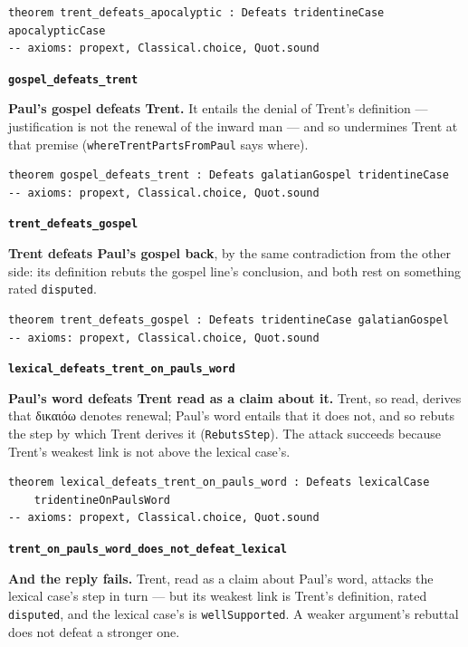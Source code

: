 \documentclass[11pt]{article}
\begin{document}
{\small\begin{verbatim}
theorem trent_defeats_apocalyptic : Defeats tridentineCase apocalypticCase
-- axioms: propext, Classical.choice, Quot.sound
\end{verbatim}}
\par\medskip\noindent\textbf{\texttt{gospel\_\allowbreak{}defeats\_\allowbreak{}trent}}\par\nobreak\noindent
\textbf{Paul's gospel defeats Trent.} It entails the denial of Trent's definition — justification is not the renewal of the inward man — and so undermines Trent at that premise (\texttt{where\allowbreak{}Trent\allowbreak{}Parts\allowbreak{}From\allowbreak{}Paul} says where).

{\small\begin{verbatim}
theorem gospel_defeats_trent : Defeats galatianGospel tridentineCase
-- axioms: propext, Classical.choice, Quot.sound
\end{verbatim}}
\par\medskip\noindent\textbf{\texttt{trent\_\allowbreak{}defeats\_\allowbreak{}gospel}}\par\nobreak\noindent
\textbf{Trent defeats Paul's gospel back}, by the same contradiction from the other side: its definition rebuts the gospel line's conclusion, and both rest on something rated \texttt{disputed}.

{\small\begin{verbatim}
theorem trent_defeats_gospel : Defeats tridentineCase galatianGospel
-- axioms: propext, Classical.choice, Quot.sound
\end{verbatim}}
\par\medskip\noindent\textbf{\texttt{lexical\_\allowbreak{}defeats\_\allowbreak{}trent\_\allowbreak{}on\_\allowbreak{}pauls\_\allowbreak{}word}}\par\nobreak\noindent
\textbf{Paul's word defeats Trent read as a claim about it.} Trent, so read, derives that δικαιόω denotes renewal; Paul's word entails that it does not, and so rebuts the step by which Trent derives it (\texttt{Rebuts\allowbreak{}Step}). The attack succeeds because Trent's weakest link is not above the lexical case's.

{\small\begin{verbatim}
theorem lexical_defeats_trent_on_pauls_word : Defeats lexicalCase
    tridentineOnPaulsWord
-- axioms: propext, Classical.choice, Quot.sound
\end{verbatim}}
\par\medskip\noindent\textbf{\texttt{trent\_\allowbreak{}on\_\allowbreak{}pauls\_\allowbreak{}word\_\allowbreak{}does\_\allowbreak{}not\_\allowbreak{}defeat\_\allowbreak{}lexical}}\par\nobreak\noindent
\textbf{And the reply fails.} Trent, read as a claim about Paul's word, attacks the lexical case's step in turn — but its weakest link is Trent's definition, rated \texttt{disputed}, and the lexical case's is \texttt{well\allowbreak{}Supported}. A weaker argument's rebuttal does not defeat a stronger one.
\end{document}
